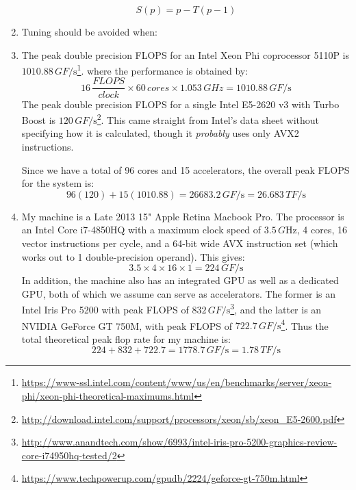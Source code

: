 \documentclass{scrartcl}
\begin{document}
\begin{enumerate}
    \[
      S(p) = p - T(p - 1)
    \]
    \item Tuning should be avoided when:
    \item The peak double precision FLOPS for an Intel Xeon Phi coprocessor 5110P is $1010.88\,\si{GF/\s}$\footnote{\url{https://www-ssl.intel.com/content/www/us/en/benchmarks/server/xeon-phi/xeon-phi-theoretical-maximums.html}}. where the performance is obtained by:
    \[
      16\,\frac{\si{FLOPS}}{\si{clock}} \times 60\,\si{cores} \times 1.053\,\si{GHz} = 1010.88\,\si{GF/\s}
    \]
    The peak double precision FLOPS for a single Intel E5-2620 v3 with Turbo Boost is $120\,\si{GF/\s}$\footnote{\url{http://download.intel.com/support/processors/xeon/sb/xeon_E5-2600.pdf}}. This came straight from Intel's data sheet without specifying how it is calculated, though it \emph{probably} uses only AVX2 instructions.

    Since we have a total of 96 cores and 15 accelerators, the overall peak FLOPS for the system is:
    \[
      96(120) + 15(1010.88) = 26683.2\,\si{GF/\s} = 26.683\,\si{TF/\s}
    \]
    \item My machine is a Late 2013 15" Apple Retina Macbook Pro. The processor is an Intel Core i7-4850HQ with a maximum clock speed of $3.5\,\si{G\Hz}$, 4 cores, 16 vector instructions per cycle, and a 64-bit wide AVX instruction set (which works out to 1 double-precision operand). This gives:
    \[
      3.5 \times 4 \times 16 \times 1 = 224\,\si{GF/\s}
    \]
    In addition, the machine also has an integrated GPU as well as a dedicated GPU, both of which we assume can serve as accelerators. The former is an Intel Iris Pro 5200 with peak FLOPS of $832\,\si{GF/\s}$\footnote{\url{http://www.anandtech.com/show/6993/intel-iris-pro-5200-graphics-review-core-i74950hq-tested/2}}, and the latter is an NVIDIA GeForce GT 750M, with peak FLOPS of $722.7\,\si{GF/\s}$\footnote{\url{https://www.techpowerup.com/gpudb/2224/geforce-gt-750m.html}}. Thus the total theoretical peak flop rate for my machine is:
    \[
      224 + 832 + 722.7 = 1778.7\,\si{GF/\s} = 1.78\,\si{TF/\s}
    \]
  \end{enumerate}
\end{document}
